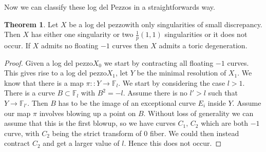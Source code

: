 \documentclass[11pt]{report}
\theoremstyle{definition}
\newtheorem{thm}{Theorem}[section]
\theoremstyle{definition}
\theoremstyle{definition}
\theoremstyle{definition}
\theoremstyle{definition}
\theoremstyle{definition}
\theoremstyle{definition}
\theoremstyle{definition}
\newcommand{\ldp}{log del pezzo}
\newcommand{\mb}[1]{\mathbb{#1}}
\begin{document}
Now we can classify these log del Pezzos in a straightforwards way. 
\begin{thm}
Let $X$ be a \ldp with only singularities of small discrepancy. Then $X$ has either one singularity or two $\frac{1}{p}(1,1)$ singularities or it does not occur. If $X$ admits no floating $-1$ curves then $X$ admits a toric degeneration.
\end{thm}
\begin{proof}
Given a \ldp $X_0$ we start by contracting all floating $-1$ curves. This gives rise to a \ldp $X_1$, let $Y$ be the minimal resolution of $X_1$. We know that there is a map $\pi : \colon Y \rightarrow \mathbb{F}_l$. We start by considering the case $l > 1$. There is a curve $B \subset \mathbb{F}_l$ with $B^2 = -l$. Assume there is no  $l' >l$ such that $Y \rightarrow \mb{F}_{l'}$. Then $B$ has to be the image of an exceptional curve $E_i$ inside $Y$. Assume our map $\pi$ involves blowing up a point on $B$. Without loss of generality we can assume that this is the first blowup, so we have curves $C_1, \, C_2$ which are both $-1$ curve, with $C_2$ being the strict transform of $0$ fiber. We could then instead contract $C_2$ and get a larger value of $l$. Hence this does not occur. 


\end{proof}
\end{document}
